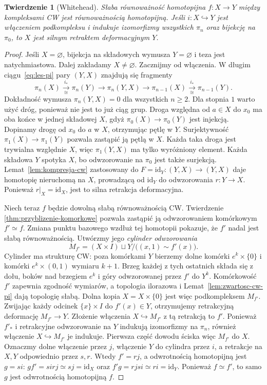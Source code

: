 \documentclass[11pt,a4paper,oneside]{report}
\newcommand{\id}{\mathrm{id}}
\theoremstyle{plain}
\newtheorem{twierdzenie}{Twierdzenie}[section]
\theoremstyle{definition}
\theoremstyle{remark}
\begin{document}
\begin{twierdzenie}[Whitehead]
\label{thm:whitehead}
Słaba równoważność homotopijna
$f:X\to Y$ między kompleksami
CW jest równoważnością
homotopijną. Jeśli
$i:X\hookrightarrow Y$
jest włączeniem podkompleksu
i indukuje izomorfizmy
wszystkich $\pi_n$ oraz
bijekcję na $\pi_0$, to
$X$ jest silnym retraktem
deformacyjnym $Y$.
\end{twierdzenie}
\begin{proof}
Jeśli $X=\varnothing$, bijekcja na składowych wymusza $Y=\varnothing$
i teza jest natychmiastowa. Dalej zakładamy $X\ne\varnothing$.
Zacznijmy od włączenia.
W długim ciągu~\eqref{eq:les-pi}
pary $(Y,X)$ znajdują się
fragmenty
\[
 \pi_n(X)\xrightarrow[\cong]{i_*}
 \pi_n(Y)\longrightarrow
 \pi_n(Y,X)\longrightarrow
 \pi_{n-1}(X)
 \xrightarrow[\cong]{i_*}
 \pi_{n-1}(Y).
\]
Dokładność wymusza
$\pi_n(Y,X)=0$ dla
wszystkich $n\geq2$.
Dla stopnia $1$ warto użyć dróg, ponieważ nie jest to już ciąg grup.
Droga względna od $a\in X$ do $x_0$ ma oba końce w jednej składowej $X$,
gdyż $\pi_0(X)\to\pi_0(Y)$ jest injekcją. Dopinamy drogę
od $x_0$ do $a$ w $X$, otrzymując pętlę w $Y$.
Surjektywność $\pi_1(X)\to\pi_1(Y)$ pozwala zastąpić ją pętlą w $X$.
Każda taka droga jest trywialna względnie $X$, więc $\pi_1(Y,X)$
ma tylko wyróżniony element. Każda składowa $Y$ spotyka $X$,
bo odwzorowanie na $\pi_0$ jest także surjekcją.
Lemat~\ref{lem:kompresja-cw}
zastosowany do
$F=\id_Y:(Y,X)\to(Y,X)$
daje homotopię nieruchomą
na $X$, prowadzącą od
$\id_Y$ do odwzorowania
$r:Y\to X$.
Ponieważ $r|_X=\id_X$,
jest to silna retrakcja
deformacyjna.

Niech teraz $f$ będzie
dowolną słabą równoważnością
CW. Twierdzenie
\ref{thm:przyblizenie-komorkowe}
pozwala zastąpić ją
odwzorowaniem komórkowym $f'\simeq f$.
Zmiana punktu bazowego wzdłuż tej homotopii pokazuje,
że $f'$ nadal jest słabą równoważnością.
Utwórzmy jego
\emph{cylinder odwzorowania}
\[
 M_{f'}=(X\times I)\sqcup Y/
       \bigl((x,1)\sim f'(x)\bigr).
\]
Cylinder ma strukturę CW: poza komórkami $Y$ bierzemy dolne
komórki $e^k\times\{0\}$ i komórki $e^k\times(0,1)$ wymiaru $k+1$.
Brzeg każdej z tych ostatnich składa się z dołu, boków nad
brzegiem $e^k$ i góry odwzorowanej przez $f'$ do $Y^k$.
Komórkowość $f'$ zapewnia zgodność wymiarów, a topologia
ilorazowa i Lemat~\ref{lem:zwartosc-cw-pi} dają topologię słabą.
Dolna kopia $X=X\times\{0\}$ jest więc podkompleksem $M_{f'}$.
Zwijając każdy odcinek
$\{x\}\times I$ do
$f'(x)\in Y$, otrzymujemy
retrakcyjną deformację
$M_{f'}\to Y$.
Złożenie włączenia
$X\hookrightarrow M_{f'}$
z tą retrakcją to $f'$.
Ponieważ $f'_*$ i
retrakcyjne odwzorowanie na $Y$
indukują izomorfizmy
na $\pi_n$, również
włączenie $X\hookrightarrow
M_{f'}$ je indukuje.
Pierwsza część dowodu
ściska więc $M_{f'}$
do $X$. Oznaczmy dolne włączenie przez $j$, włączenie $Y$ do cylindra przez $i$,
a retrakcje na $X,Y$ odpowiednio przez $s,r$.
Wtedy $f'=rj$, a odwrotnością homotopijną jest $g=si$:
$gf'=sirj\simeq sj=\id_X$ oraz $f'g=rjsi\simeq ri=\id_Y$.
Ponieważ $f\simeq f'$, to samo $g$ jest odwrotnością homotopijną $f$.
\end{proof}
\end{document}
